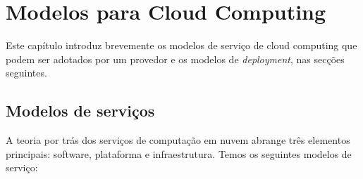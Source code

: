 \chapter{Modelos para Cloud Computing}

Este capítulo introduz brevemente os modelos de serviço de cloud computing que podem ser adotados por um provedor e os modelos de \textit{deployment}, nas secções seguintes.

\section{Modelos de serviços}

A teoria por trás dos serviços de computação em nuvem abrange três elementos principais: software, plataforma e infraestrutura. Temos os seguintes modelos de serviço:

